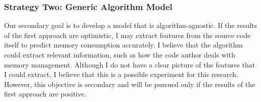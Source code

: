 \subsubsection{Strategy Two: Generic Algorithm Model}
\label{subsubsec:generic-algorithm-model}

Our secondary goal is to develop a model that is algorithm-agnostic.
If the results of the first approach are optimistic, I may extract features from the source code itself to predict memory consumption accurately.
I believe that the algorithm could extract relevant information, such as how the code author deals with memory management.
Although I do not have a clear picture of the features that I could extract, I believe that this is a possible experiment for this research.
However, this objective is secondary and will be pursued only if the results of the first approach are positive.
